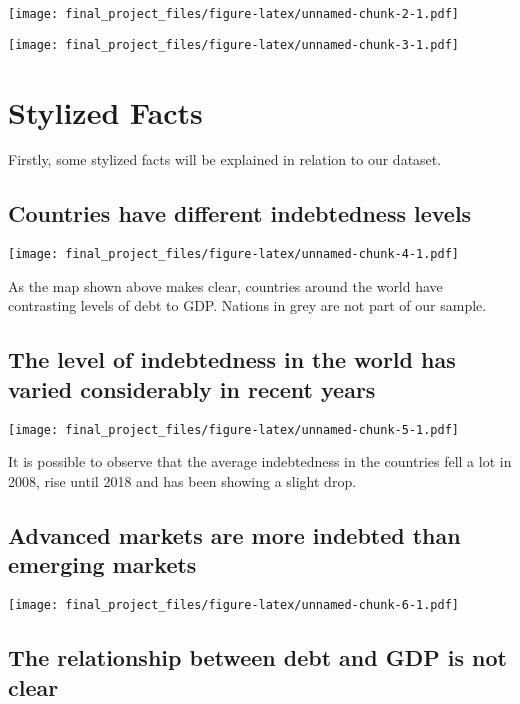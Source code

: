 \documentclass[]{article}
\begin{document}
\texttt{[image: final\_project\_files/figure-latex/unnamed-chunk-2-1.pdf]}

\texttt{[image: final\_project\_files/figure-latex/unnamed-chunk-3-1.pdf]}

\section{Stylized Facts}\label{stylized-facts}

Firstly, some stylized facts will be explained in relation to our
dataset.

\subsection{Countries have different indebtedness
levels}\label{countries-have-different-indebtedness-levels}

\texttt{[image: final\_project\_files/figure-latex/unnamed-chunk-4-1.pdf]}

As the map shown above makes clear, countries around the world have
contrasting levels of debt to GDP. Nations in grey are not part of our
sample.

\subsection{The level of indebtedness in the world has varied
considerably in recent
years}\label{the-level-of-indebtedness-in-the-world-has-varied-considerably-in-recent-years}

\texttt{[image: final\_project\_files/figure-latex/unnamed-chunk-5-1.pdf]}

It is possible to observe that the average indebtedness in the countries
fell a lot in 2008, rise until 2018 and has been showing a slight drop.

\subsection{Advanced markets are more indebted than emerging
markets}\label{advanced-markets-are-more-indebted-than-emerging-markets}

\texttt{[image: final\_project\_files/figure-latex/unnamed-chunk-6-1.pdf]}

\subsection{The relationship between debt and GDP is not
clear}\label{the-relationship-between-debt-and-gdp-is-not-clear}
\end{document}
